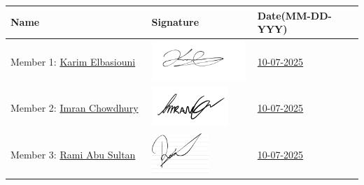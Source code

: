 \documentclass[12pt]{article}
\begin{document}
\begin{center}
\begin{tabular}{|p{0.4\linewidth}|p{0.3\linewidth}|p{0.3\linewidth}|}
\hline
\textbf{Name} & \textbf{Signature} & \textbf{Date(MM-DD-YYY)} \\
\hline
Member 1: \underline{Karim Elbasiouni} & \includegraphics[height=1.5cm]{Signatures/Karim-Signature.png} & \underline{10-07-2025} \\
\hline
Member 2: \underline{Imran Chowdhury} & \includegraphics[height=1.5cm]{Signatures/Imran-Signature.png} & \underline{10-07-2025} \\
\hline
Member 3: \underline{Rami Abu Sultan} & \includegraphics[height=1.5cm]{Signatures/Rami-Signature.jpg} & \underline{10-07-2025} \\
\hline
\end{tabular}
\end{center}
\end{document}
